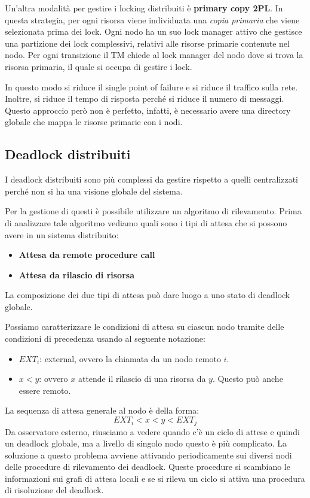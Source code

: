 Un'altra modalità per gestire i locking distribuiti è \textbf{primary copy 2PL}.
In questa strategia, per ogni risorsa viene individuata una \textit{copia primaria}
che viene selezionata prima dei lock. Ogni nodo ha un suo lock manager attivo che
gestisce una partizione dei lock complessivi, relativi alle risorse primarie
contenute nel nodo. Per ogni transizione il TM chiede al lock manager del nodo
dove si trova la risorsa primaria, il quale si occupa di gestire i lock.

In questo modo si riduce il single point of failure e si riduce il traffico
sulla rete. Inoltre, si riduce il tempo di risposta perché si riduce il numero
di messaggi. Questo approccio però non è perfetto, infatti, è necessario avere
una directory globale che mappa le risorse primarie con i nodi.
\subsection{Deadlock distribuiti}
I deadlock distribuiti sono più complessi da gestire rispetto a quelli centralizzati
perché non si ha una visione globale del sistema.

Per la gestione di questi è possibile utilizzare un algoritmo di rilevamento.
Prima di analizzare tale algoritmo vediamo quali sono i tipi di attesa che
si possono avere in un sistema distribuito:
\begin{itemize}
      \item \textbf{Attesa da remote procedure call}
      \item \textbf{Attesa da rilascio di risorsa}
\end{itemize}
La composizione dei due tipi di attesa può dare luogo a uno stato di deadlock
globale.

Possiamo caratterizzare le condizioni di attesa su ciascun nodo tramite delle
condizioni di precedenza usando al seguente notazione:
\begin{itemize}
      \item \textbf{$EXT_i$}: external, ovvero la chiamata da un nodo remoto $i$.
      \item $x < y$: ovvero $x$ attende il rilascio di una risorsa da $y$. Questo
            può anche essere remoto.
\end{itemize}
La sequenza di attesa generale al nodo è della forma:
\begin{equation*}
      EXT_i < x < y < EXT_j
\end{equation*}
Da osservatore esterno, riusciamo a vedere quando c'è un ciclo di attese e
quindi un deadlock globale, ma a livello di singolo nodo questo è più complicato.
La soluzione a questo problema avviene attivando periodicamente sui diversi nodi
delle procedure di rilevamento dei deadlock. Queste procedure si scambiano le
informazioni sui grafi di attesa locali e se si rileva un ciclo si attiva una
procedura di risoluzione del deadlock.

